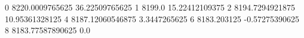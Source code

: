 0 8220.0009765625 36.22509765625
1 8199.0 15.22412109375
2 8194.7294921875 10.95361328125
4 8187.12060546875 3.3447265625
6 8183.203125 -0.57275390625
8 8183.77587890625 0.0
